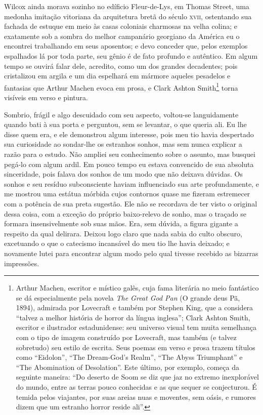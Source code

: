 Wilcox ainda morava sozinho no edíficio Fleur-de-Lys, em Thomas Street,
uma medonha imitação vitoriana da arquitetura bretã do século \textsc{xvii},
ostentando sua fachada de estuque em meio às casas coloniais charmosas
na velha colina; e exatamente sob a sombra do melhor campanário
georgiano da América eu o encontrei trabalhando em seus aposentos; e
devo conceder que, pelos exemplos espalhados lá por toda parte, seu
gênio é de fato profundo e autêntico. Em algum tempo se ouvirá falar
dele, acredito, como um dos grandes decadentes; pois cristalizou em
argila e um dia espelhará em mármore aqueles pesadelos e fantasias que
Arthur Machen evoca em prosa, e Clark Ashton Smith\footnote{Arthur
  Machen, escritor e místico galês, cuja fama literária no
  meio fantástico se dá especialmente pela novela \emph{The Great God
  Pan} (O grande deus Pã, 1894), admirada por Lovecraft e também por Stephen King, que a
  considera ``talvez a melhor história de horror da língua inglesa'';
  Clark Ashton Smith, escritor e ilustrador estadunidense:
  seu universo visual tem muita semelhança com o tipo de imagem
  construído por Lovecraft, mas também (e talvez sobretudo) seu estilo
  de escrita. Seus poemas em verso e prosa trazem títulos como
  ``Eidolon'', ``The Dream-God's Realm'', ``The Abyss Triumphant'' e
  ``The Abomination of Desolation''. Este último, por exemplo, começa da
  seguinte maneira: ``Do deserto de Soom se diz que jaz no extremo
  inexplorável do mundo, entre as terras pouco conhecidas e as que
  sequer se conjecturou. É temida pelos viajantes, por suas areias nuas
  e moventes, sem oásis, e rumores dizem que um estranho horror reside
  ali''.} torna visíveis em verso e pintura.

Sombrio, frágil e algo descuidado com seu aspecto, voltou-se
languidamente quando bati à sua porta e perguntou, sem se levantar, o
que queria ali. Eu lhe disse quem era, e ele demonstrou algum interesse,
pois meu tio havia despertado sua curiosidade ao sondar-lhe os estranhos
sonhos, mas sem nunca explicar a razão para o estudo. Não ampliei seu
conhecimento sobre o assunto, mas busquei pegá-lo com algum ardil. Em
pouco tempo eu estava convencido de sua absoluta sinceridade, pois
falava dos sonhos de um modo que não deixava dúvidas. Os sonhos e seu resíduo
subconsciente haviam influenciado sua arte profundamente, e me mostrou
uma estátua mórbida cujos contornos quase me fizeram estremecer com a
potência de sua preta sugestão. Ele não se recordava de ter visto o
original dessa coisa, com a exceção do próprio baixo-relevo de
sonho, mas o traçado se formara insensivelmente sob suas mãos. Era,
sem dúvida, a figura gigante a respeito da qual delirara. Deixou logo
claro que nada sabia do culto obscuro, excetuando o que o catecismo
incansável do meu tio lhe havia deixado; e novamente lutei para
encontrar algum modo pelo qual tivesse recebido as bizarras impressões.


